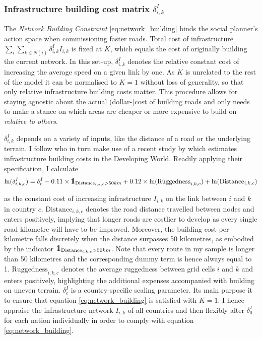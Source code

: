 \documentclass[11pt, oneside]{article}   	%
\def\one{\mbox{1\hspace{-4.25pt}\fontsize{12}{14.4}\selectfont\textrm{1}}} %
\begin{document}
\subsubsection{Infrastructure building cost matrix $\delta_{i,k}^{I}$}
The \emph{Network Building Constraint} \eqref{eq:network_building} binds the social planner's action space when commissioning faster roads. Total cost of infrastructure $\sum_{i}^{}\sum_{k \in N(i)}^{} \delta_{i,k}^{I}I_{i,k}$ is fixed at $K$, which equals the cost of originally building the current network. In this set-up, $\delta_{i,k}^{I}$ denotes the relative constant cost of increasing the average speed on a given link by one. As $K$ is unrelated to the rest of the model it can be normalised to $K=1$ without loss of generality, so that only relative infrastructure building costs matter. This procedure allows for staying agnostic about the actual (dollar-)cost of building roads and only needs to make a stance on which areas are cheaper or more expensive to build on \emph{relative to others}.

$\delta_{i,k}^{I}$ depends on a variety of inputs, like the distance of a road or the underlying terrain. I follow \citeauthor{fajgelbaum_optimal_2017} who in turn make use of a recent study by \cite{collier_cost_2015} which estimates infrastructure building costs in the Developing World. Readily applying their specification, I calculate
\begin{equation}
  \textrm{ln}(\delta^{I}_{i,k,c}) = \delta_{c}^{I} - 0.11 \times \one_{\textrm{Distance}_{i,k,c} > 50km} + 0.12 \times \textrm{ln}(\textrm{Ruggedness}_{i,k,c}) + \textrm{ln}(\textrm{Distance}_{i,k,c})
  \label{eq:delta_I}
\end{equation}

as the constant cost of increasing infrastructure $I_{i,k}$ on the link between $i$ and $k$ in country $c$. $\textrm{Distance}_{i,k,c}$ denotes the road distance travelled between nodes and enters positively, implying that longer roads are costlier to develop as every single road kilometre will have to be improved. Moreover, the building cost per kilometre falls discretely when the distance surpasses 50 kilometres, as embodied by the indicator $\one_{\textrm{Distance}_{i,k,c} > 50km}$. Note that every route in my sample is longer than 50 kilometres and the corresponding dummy term is hence always equal to 1. $\textrm{Ruggedness}_{i,k,c}$ denotes the average ruggedness between grid cells $i$ and $k$ and enters positively, highlighting the additional expenses accompanied with building on uneven terrain. $\delta_{c}^{I}$ is a country-specific scaling parameter. Its main purpose it to ensure that equation \eqref{eq:network_building} is satisfied with $K=1$. I hence appraise the infrastructure network $I_{i,k}$ of all countries and then flexibly alter $\delta_{0}^{I}$ for each nation individually in order to comply with equation \eqref{eq:network_building}.
\end{document}
